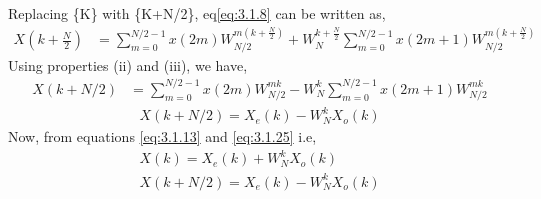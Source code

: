\documentclass{beamer}
\begin{document}
\begin{frame}
Replacing \{K\} with \{K+N/2\}, eq\eqref{eq:3.1.8} can be written as,
\begin{align}
    X(k+\frac{N}{2}) &= \sum_{m=0}^{{N/2}-1} x(2m)W^{m(k+\frac{N}{2})}_{N/2} +W^{k+\frac{N}{2}}_{N} \sum_{m=0}^{{N/2}-1} x(2m+1)W^{m(k+\frac{N}{2})}_{N/2}
\end{align}
Using properties (ii) and (iii), we have,
\begin{align}
    X(k+N/2) &= \sum_{m=0}^{{N/2}-1} x(2m)W^{mk}_{N/2} - W^{k}_{N} \sum_{m=0}^{{N/2}-1} x(2m+1)W^{mk}_{N/2} 
\end{align}
\begin{align}
    X(k+N/2) = X_{e}(k) - W_{N}^k X_{o}(k) \label{eq:3.1.25}
\end{align}
Now, from equations \eqref{eq:3.1.13} and \eqref{eq:3.1.25} i.e,
\begin{align}
    X(k) = X_{e}(k) + W_{N}^k X_{o}(k) \\
    X(k+N/2) = X_{e}(k) - W_{N}^k X_{o}(k) 
\end{align}
\end{frame}
\end{document}
